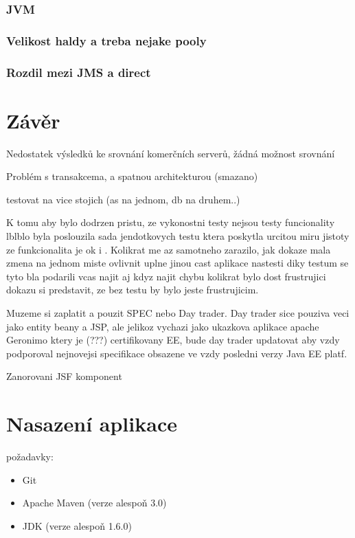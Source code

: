 \documentclass[122pt,oneside]{fithesis}
\begin{document}
\subsection{JVM}
\subsection{Velikost haldy a treba nejake pooly}
\subsection{Rozdil mezi JMS a direct}

\chapter*{Závěr}

Nedostatek výsledků ke srovnání komerčních serverů, žádná možnost srovnání 

Problém s transakcema, a spatnou architekturou (smazano)

testovat na vice stojich (as na jednom, db na druhem..)

K tomu aby bylo dodrzen pristu, ze vykonostni testy nejsou testy funcionality lblblo byla poslouzila sada jendotkovych testu ktera poskytla urcitou miru jistoty ze funkcionalita je ok i . Kolikrat me az samotneho zarazilo, jak dokaze mala zmena na jednom miste ovlivnit uplne jinou cast aplikace nastesti diky testum se tyto bla podarili vcas najit aj kdyz najit chybu kolikrat bylo dost frustrujici dokazu si predstavit, ze bez testu by bylo jeste frustrujicim.

Muzeme si zaplatit a pouzit SPEC nebo Day trader. Day trader sice pouziva veci jako entity beany a JSP, ale jelikoz vychazi jako ukazkova aplikace apache Geronimo ktery je (???) certifikovany EE, bude day trader updatovat aby vzdy podporoval nejnovejsi specifikace obsazene ve vzdy posledni verzy Java EE platf.

Zanorovani JSF komponent

\appendix

\chapter{Nasazení aplikace} 
požadavky:
\begin{itemize}
  \item Git
  \item Apache Maven (verze alespoň 3.0)
  \item JDK (verze alespoň 1.6.0)
\end{itemize}
\end{document}
